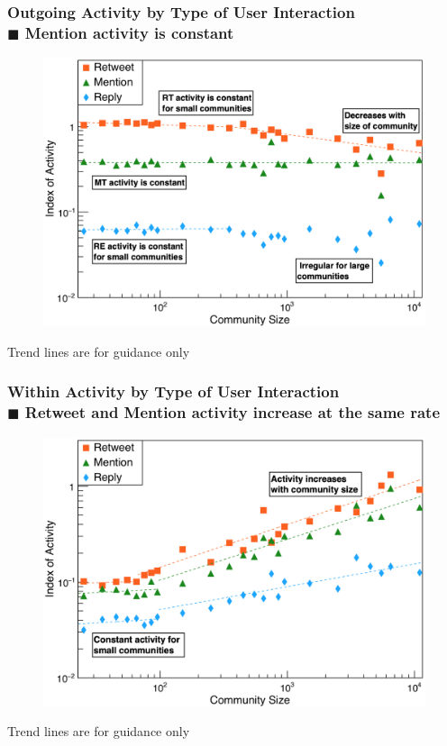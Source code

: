 \documentclass{beamer}
\begin{document}

\begin{frame}
\frametitle{Outgoing Activity by Type of User Interaction \\ \normalsize $\blacksquare$ Mention activity is constant}
\begin{figure}
	\vspace*{-0.1cm}
	\includegraphics[width=0.8\linewidth]{figures/activity/outgoing}
\end{figure}
\small Trend lines are for guidance only

\end{frame}


\begin{frame}
\frametitle{Within Activity by Type of User Interaction \\ \normalsize $\blacksquare$ Retweet and Mention activity increase at the same rate}
\begin{figure}[t]
	\vspace*{-0.1cm}
	\includegraphics[width=0.8\linewidth]{figures/activity/within}
\end{figure}
\small Trend lines are for guidance only
 
\end{frame}
\end{document}
